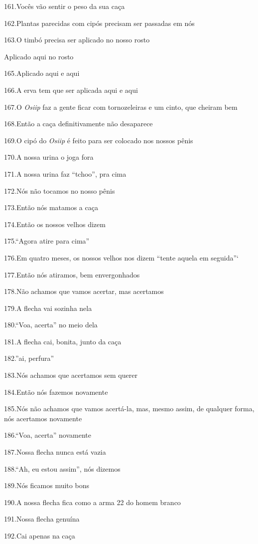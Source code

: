 161.Vocês vão sentir o peso da sua caça

162.Plantas parecidas com cipós precisam ser passadas em nós

163.O timbó precisa ser aplicado no nosso rosto

Aplicado aqui no rosto

165.Aplicado aqui e aqui

166.A erva tem que ser aplicada aqui e aqui

167.O \emph{Osiip} faz a gente ficar com tornozeleiras e um cinto, que
cheiram bem

168.Então a caça definitivamente não desaparece

169.O cipó do \emph{Osiip} é feito para ser colocado nos nossos pênis

170.A nossa urina o joga fora

171.A nossa urina faz ``tchoo'', pra cima

172.Nós não tocamos no nosso pênis

173.Então nós matamos a caça

174.Então os nossos velhos dizem

175.``Agora atire para cima''

176.Em quatro meses, os nossos velhos nos dizem ``tente aquela em
seguida''`

177.Então nós atiramos, bem envergonhados

178.Não achamos que vamos acertar, mas acertamos

179.A flecha vai sozinha nela

180.``Voa, acerta'' no meio dela

181.A flecha cai, bonita, junto da caça

182.''ai, perfura''

183.Nós achamos que acertamos sem querer

184.Então nós fazemos novamente

185.Nós não achamos que vamos acertá-la, mas, mesmo assim, de qualquer
forma, nós acertamos novamente

186.``Voa, acerta'' novamente

187.Nossa flecha nunca está vazia

188.``Ah, eu estou assim'', nós dizemos

189.Nós ficamos muito bons

190.A nossa flecha fica como a arma 22 do homem branco

191.Nossa flecha genuína

192.Cai apenas na caça


